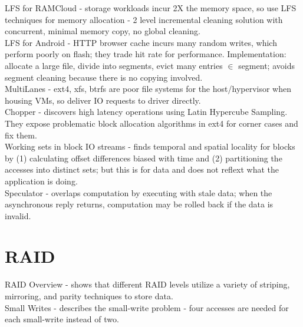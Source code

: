 \documentclass{article}
\begin{document}
\noindent\cite{rumble:fast2014-lfs-for-dram} LFS for RAMCloud - storage workloads incur 2X the memory space, so use LFS techniques for memory allocation - 2 level incremental cleaning solution with concurrent, minimal memory copy, no global cleaning.\\

\noindent\cite{aghayev:inflow2013-lfs-for-android} LFS for Android - HTTP browser cache incurs many random writes, which perform poorly on flash; they trade hit rate for performance. Implementation: allocate a large file, divide into segments, evict many entries \(\in\) segment; avoids segment cleaning because there is no copying involved.\\

\noindent\cite{kang:fast2014-multilanes} MultiLanes - ext4, xfs, btrfs are poor  file systems for the host/hypervisor when housing VMs, so deliver IO requests to driver directly.\\

\noindent\cite{he:fast2015-chopper} Chopper - discovers high latency operations using Latin Hypercube Sampling. They expose problematic block allocation algorithms in ext4 for corner cases and fix them. \\

\noindent\cite{wildani:systor2011-block-locality} Working sets in block IO streams - finds temporal and spatial locality for blocks by (1) calculating offset differences biased with time and (2) partitioning the accesses into distinct sets; but this is for data and does not reflext what the application is doing. \\

\noindent\cite{nightingale:sosp2005-speculator} Speculator - overlaps computation by executing with stale data; when the asynchronous reply returns, computation may be rolled back if the data is invalid.

\section{RAID}

\noindent\cite{stodolsky:techreport1994-redundant} RAID Overview - shows that different RAID levels utilize a variety of striping, mirroring, and parity techniques to store data. \\

\noindent\cite{stodolsky:comparch1993-paritylogging} Small Writes - describes the small-write problem - four accesses are needed for each small-write instead of two.\\
\end{document}
